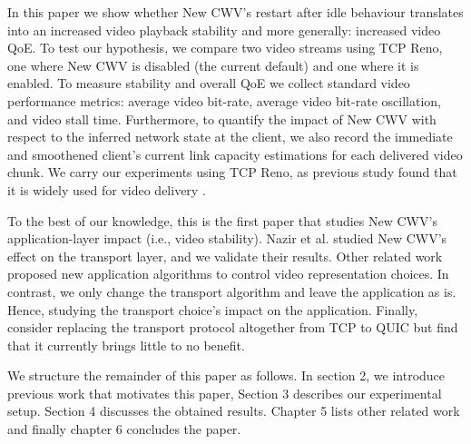 \documentclass[10pt,sigconf]{acmart}
\begin{document}
In this paper we show whether New CWV's restart after idle behaviour translates into an increased video playback stability and more generally: increased video QoE. To test our hypothesis, we compare two video streams using TCP Reno, one where New CWV is disabled (the current default) and one where it is enabled. To measure stability and overall QoE we collect standard video performance metrics: average video bit-rate, average video bit-rate oscillation, and video stall time. Furthermore, to quantify the impact of New CWV with respect to the inferred network state at the client, we also record the immediate and smoothened client's current link capacity estimations for each delivered video chunk. We carry our experiments using TCP Reno, as previous study found that it is widely used for video delivery \cite{Mishra-2019-the-great-internet-tcp-congestion-control-census}.


To the best of our knowledge, this is the first paper that studies New CWV's application-layer impact (i.e., video stability). Nazir et al. \cite{Nazir-2014-performance-evaluation-congestion-window-validation-dash-newcwv} studied New CWV's effect on the transport layer, and we validate their results. Other related work proposed new application algorithms to control video representation choices\cite{Mok-2012-qdash,Huang-2015-A-buffer-based-approach-to-rate-adaptation-bba, Yin-2015-a-control-theoritic-approach}. In contrast, we only change the transport algorithm and leave the application as is. Hence, studying the transport choice's impact on the application. Finally, \cite{Bhat-2017-not-so-quic} consider replacing the transport protocol altogether from TCP to QUIC but find that it currently brings little to no benefit. 


We structure the remainder of this paper as follows. In section 2, we introduce previous work that motivates this paper, Section 3 describes our experimental setup. Section 4 discusses the obtained results. Chapter 5 lists other related work and finally chapter 6 concludes the paper.
\end{document}
